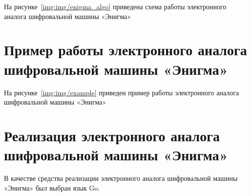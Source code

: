 На рисунке~\ref{img:img/enigma_algo} приведена схема работы электронного аналога шифровальной машины «Энигма»

\FloatBarrier
{}
\FloatBarrier

\chapter{Пример работы электронного аналога шифровальной машины «Энигма»}

На рисунке~\ref{img:img/example} приведен пример работы электронного аналога шифровальной машины «Энигма»

\FloatBarrier
{}
\FloatBarrier


\chapter{Реализация электронного аналога шифровальной машины «Энигма»}
В качестве средства реализации электронного аналога шифровальной машины «Энигма» был выбран язык Go.

